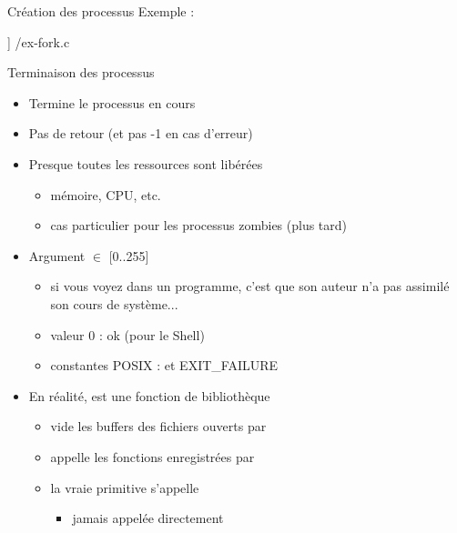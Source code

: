 \begin {frame} {Création des processus}
    Exemple :

    \fC\lstmonstyle] {\inc/ex-fork.c}
\end {frame}

\begin {frame} {Terminaison des processus}

    \begin {itemize}
	\item Termine le processus en cours
	\item Pas de retour (et pas -1 en cas d'erreur)
	\item Presque toutes les ressources sont libérées
	    \begin {itemize}
		\item mémoire, CPU, etc.
		\item cas particulier pour les processus zombies (plus tard)
	    \end {itemize}
	\item Argument  $\in$ [0..255]
	    \begin {itemize}
		\item si vous voyez  dans un
		    programme, c'est que son auteur n'a pas assimilé
		    son cours de système...
		\item valeur 0 : ok (pour le Shell)
		\item constantes POSIX :  et \code
		    {EXIT\_FAILURE}

	    \end {itemize}
	\item En réalité,  est une fonction de bibliothèque
	    \begin {itemize}
		\item vide les buffers des fichiers ouverts par 
		\item appelle les fonctions enregistrées par 
		\item la vraie primitive s'appelle 
		    \begin {itemize}
			\item jamais appelée directement
		    \end {itemize}
	    \end {itemize}
    \end {itemize}
\end {frame}

